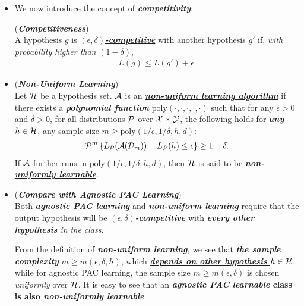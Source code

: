 \documentclass[11pt]{article}
\begin{document}
\begin{itemize}
\item We now introduce the concept of \emph{\textbf{competitivity}}:
\begin{definition} (\emph{\textbf{Competitiveness}}) \\
A hypothesis $g$ is \underline{\emph{\textbf{$(\epsilon, \delta)$-competitive}}} with another hypothesis $g'$ if, \emph{with probability higher than} $(1 - \delta)$,
\begin{align*}
L(g) \le L(g') + \epsilon.
\end{align*}
\end{definition}

\item  \begin{definition} (\emph{\textbf{Non-Uniform Learning}})\\
Let ${\mathcal H}$ be a hypothesis set. ${\mathcal A}$ is an \underline{\emph{\textbf{non-uniform learning algorithm}}} if there
exists a \emph{\textbf{polynomial function}} $\text{poly}(\cdot, \cdot, \cdot, \cdot, \cdot)$  such that for any $\epsilon > 0$ and $\delta > 0$,
for all distributions ${\mathcal P}$ over ${\mathcal X} \times {\mathcal Y}$, the following holds for \textbf{\emph{any}} $h \in {\mathcal H}$, any sample size $m \ge \text{poly}(1/\epsilon, 1/\delta, \underline{h}, d)$:
\begin{align}
{\mathcal P}^{m}\left\{L_{{\mathcal P}}({\mathcal A}({\mathcal D}_{m})) - L_{{\mathcal P}}(h)  \le \epsilon \right\} \ge 1 - \delta. \label{eqn: agnostic_pac_definition}
\end{align} If ${\mathcal A}$ further runs in $\text{poly}(1/\epsilon, 1/\delta, h, d)$, then ${\mathcal H}$ is said to be \emph{\textbf{\underline{non-uniformly learnable}}}. 
\end{definition}

\item \begin{remark} (\textbf{\emph{Compare with Agnostic PAC Learning}})\\
Both \emph{\textbf{agnostic PAC learning}} and \emph{\textbf{non-uniform learning}} require that the output hypothesis will be \emph{\textbf{$(\epsilon, \delta)$-competitive}} with \emph{\textbf{every other hypothesis} in the class}. 

From the definition of \emph{\textbf{non-uniform learning}}, we see that \emph{\textbf{the sample complexity}} $m \ge m(\epsilon, \delta, h)$, which \underline{\emph{\textbf{depends on other hypothesis}} $h \in {\mathcal H}$}, while for agnostic PAC learning, the sample size $m \ge m(\epsilon, \delta)$ is chosen \emph{uniformly} over ${\mathcal H}$.  It is easy to see that an \textbf{\emph{agnostic PAC learnable} class is also \emph{non-uniformly learnable}}.
\end{remark}
\end{itemize}
\end{document}
